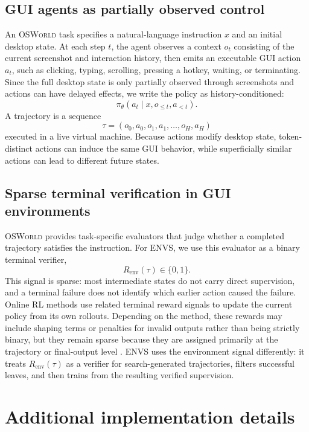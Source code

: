\documentclass[11pt]{article}
\begin{document}
\subsection{GUI agents as partially observed control}

An \textsc{OSWorld} task specifies a natural-language instruction \(x\) and an initial desktop state. At each step \(t\), the agent observes a context \(o_t\) consisting of the current screenshot and interaction history, then emits an executable GUI action \(a_t\), such as clicking, typing, scrolling, pressing a hotkey, waiting, or terminating. Since the full desktop state is only partially observed through screenshots and actions can have delayed effects, we write the policy as history-conditioned:
\[
    \pi_\theta(a_t \mid x, o_{\leq t}, a_{<t}).
\]
A trajectory is a sequence
\[
    \tau = (o_0, a_0, o_1, a_1, \ldots, o_H, a_H)
\]
executed in a live virtual machine. Because actions modify desktop state, token-distinct actions can induce the same GUI behavior, while superficially similar actions can lead to different future states.

\subsection{Sparse terminal verification in GUI environments}

\textsc{OSWorld} provides task-specific evaluators that judge whether a completed trajectory satisfies the instruction. For ENVS, we use this evaluator as a binary terminal verifier,
\[
    R_{\mathrm{env}}(\tau) \in \{0,1\}.
\]
This signal is sparse: most intermediate states do not carry direct supervision, and a terminal failure does not identify which earlier action caused the failure. Online RL methods use related terminal reward signals to update the current policy from its own rollouts. Depending on the method, these rewards may include shaping terms or penalties for invalid outputs rather than being strictly binary, but they remain sparse because they are assigned primarily at the trajectory or final-output level \citep{dong2025agentic_arpo, lu2025arpo_gui}. ENVS uses the environment signal differently: it treats \(R_{\mathrm{env}}(\tau)\) as a verifier for search-generated trajectories, filters successful leaves, and then trains from the resulting verified supervision.

\section{Additional implementation details}
\end{document}
